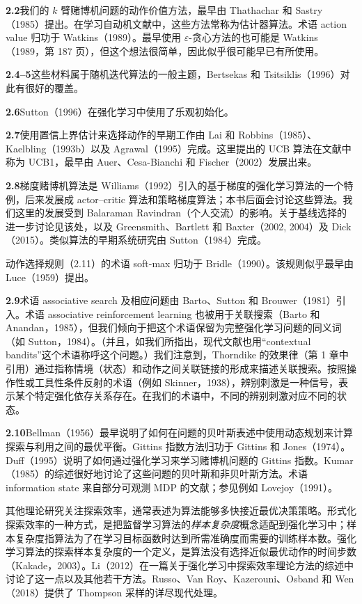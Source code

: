 \documentclass[UTF8, 12pt, fontset=fandol, oneside]{ctexart}
\begin{document}
\noindent\textbf{2.2}\quad 我们的 $k$ 臂赌博机问题的动作价值方法，最早由 Thathachar 和 Sastry（1985）提出。在学习自动机文献中，这些方法常称为估计器算法。术语 action value 归功于 Watkins（1989）。最早使用 $\varepsilon$-贪心方法的也可能是 Watkins（1989，第 187 页），但这个想法很简单，因此似乎很可能早已有所使用。

\noindent\textbf{2.4--5}\quad 这些材料属于随机迭代算法的一般主题，Bertsekas 和 Tsitsiklis（1996）对此有很好的覆盖。

\noindent\textbf{2.6}\quad Sutton（1996）在强化学习中使用了乐观初始化。

\noindent\textbf{2.7}\quad 使用置信上界估计来选择动作的早期工作由 Lai 和 Robbins（1985）、Kaelbling（1993b）以及 Agrawal（1995）完成。这里提出的 UCB 算法在文献中称为 UCB1，最早由 Auer、Cesa-Bianchi 和 Fischer（2002）发展出来。

\noindent\textbf{2.8}\quad 梯度赌博机算法是 Williams（1992）引入的基于梯度的强化学习算法的一个特例，后来发展成 actor--critic 算法和策略梯度算法；本书后面会讨论这些算法。我们这里的发展受到 Balaraman Ravindran（个人交流）的影响。关于基线选择的进一步讨论见该处，以及 Greensmith、Bartlett 和 Baxter（2002, 2004）及 Dick（2015）。类似算法的早期系统研究由 Sutton（1984）完成。

动作选择规则（2.11）的术语 soft-max 归功于 Bridle（1990）。该规则似乎最早由 Luce（1959）提出。

\noindent\textbf{2.9}\quad 术语 associative search 及相应问题由 Barto、Sutton 和 Brouwer（1981）引入。术语 associative reinforcement learning 也被用于关联搜索（Barto 和 Anandan，1985），但我们倾向于把这个术语保留为完整强化学习问题的同义词（如 Sutton，1984）。（并且，如我们所指出，现代文献也用“contextual bandits”这个术语称呼这个问题。）我们注意到，Thorndike 的效果律（第 1 章中引用）通过指称情境（状态）和动作之间关联链接的形成来描述关联搜索。按照操作性或工具性条件反射的术语（例如 Skinner，1938），辨别刺激是一种信号，表示某个特定强化依存关系存在。在我们的术语中，不同的辨别刺激对应不同的状态。

\noindent\textbf{2.10}\quad Bellman（1956）最早说明了如何在问题的贝叶斯表述中使用动态规划来计算探索与利用之间的最优平衡。Gittins 指数方法归功于 Gittins 和 Jones（1974）。Duff（1995）说明了如何通过强化学习来学习赌博机问题的 Gittins 指数。Kumar（1985）的综述很好地讨论了这些问题的贝叶斯和非贝叶斯方法。术语 information state 来自部分可观测 MDP 的文献；参见例如 Lovejoy（1991）。

其他理论研究关注探索效率，通常表述为算法能够多快接近最优决策策略。形式化探索效率的一种方式，是把监督学习算法的\emph{样本复杂度}概念适配到强化学习中；样本复杂度指算法为了在学习目标函数时达到所需准确度而需要的训练样本数。强化学习算法的探索样本复杂度的一个定义，是算法没有选择近似最优动作的时间步数（Kakade，2003）。Li（2012）在一篇关于强化学习中探索效率理论方法的综述中讨论了这一点以及其他若干方法。Russo、Van Roy、Kazerouni、Osband 和 Wen（2018）提供了 Thompson 采样的详尽现代处理。
\end{document}
